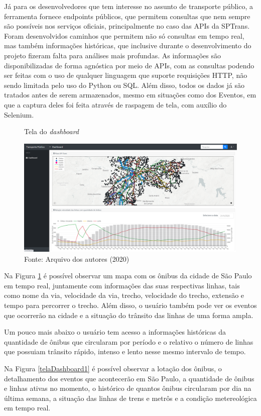 \par Já para os desenvolvedores que tem interesse no assunto de transporte público, a ferramenta fornece endpoints públicos, que permitem consultas que nem sempre são possíveis nos serviços oficiais, principalmente no caso das APIs da SPTrans. Foram desenvolvidos caminhos que permitem não só consultas em tempo real, mas também informações históricas, que inclusive durante o desenvolvimento do projeto fizeram falta para análises mais profundas. As informações são disponibilizadas de forma agnóstica por meio de APIs, com as consultas podendo ser feitas com o uso de qualquer linguagem que suporte requisições HTTP, não sendo limitada pelo uso do Python ou SQL. Além disso, todos os dados já são tratados antes de serem armazenados, mesmo em situações como dos Eventos, em que a captura deles foi feita através de raspagem de tela, com auxílio do Selenium.
\begin{figure}[H]
    \centering
    \caption{Tela do \textit{dashboard}}
    \includegraphics[width=1.0\linewidth]{Imagens/dashboard2.png}
    \caption*{Fonte: Arquivo dos autores (2020)}
    \label{telaDashboard2}
\end{figure}
\indent
\par Na Figura \ref{telaDashboard2} é possível observar um mapa com os ônibus da cidade de São Paulo em tempo real, juntamente com informações das suas respectivas linhas, tais como nome da via, velocidade da via, trecho, velocidade do trecho, extensão e tempo para percorrer o trecho. Além disso, o usuário também pode ver os eventos que ocorrerão na cidade e a situação do trânsito das linhas de uma forma ampla.
\indent
\par Um pouco mais abaixo o usuário tem acesso a informações históricas da quantidade de ônibus que circularam por período e o relativo o número de linhas que possuiam trânsito rápido, intenso e lento nesse mesmo intervalo de tempo.
\indent
\par Na Figura \ref{telaDashboard1} é possível observar a lotação dos ônibus, o detalhamento dos eventos que acontecerão em São Paulo, a quantidade de ônibus e linhas ativas no momento, o histórico de quantos ônibus circularam por dia na última semana, a situação das linhas de trens e metrôs e a condição metereológica em tempo real.

